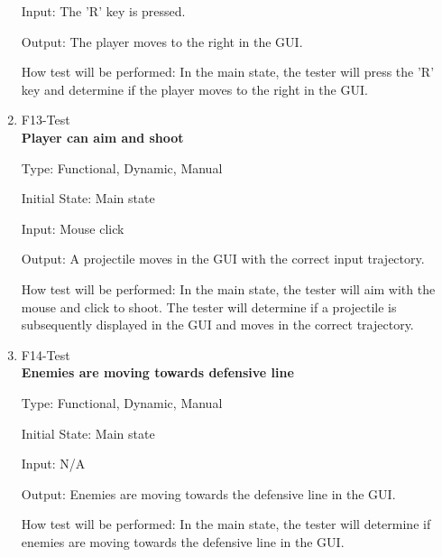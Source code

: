\documentclass[12pt, titlepage]{article}
\begin{document}
\begin{enumerate}
Input: The 'R' key is pressed.
					
Output: The player moves to the right in the GUI.
					
How test will be performed: In the main state, the tester will press the 'R' key and determine if the player moves to the right in the GUI.

\item{F13-Test} \\
\textbf{Player can aim and shoot}

Type: Functional, Dynamic, Manual
					
Initial State: Main state
					
Input: Mouse click
					
Output: A projectile moves in the GUI with the correct input trajectory.
					
How test will be performed: In the main state, the tester will aim with the mouse and click to shoot.  The tester will determine if a projectile is subsequently displayed in the GUI and moves in the correct trajectory.

\item{F14-Test} \\
\textbf{Enemies are moving towards defensive line}

Type: Functional, Dynamic, Manual
					
Initial State: Main state
					
Input: N/A
					
Output: Enemies are moving towards the defensive line in the GUI.
					
How test will be performed: In the main state, the tester will determine if enemies are moving towards the defensive line in the GUI.

\end{enumerate}
\end{document}
